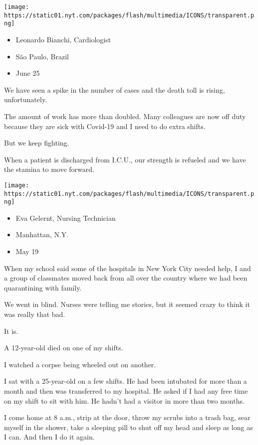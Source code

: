 \texttt{[image: https://static01.nyt.com/packages/flash/multimedia/ICONS/transparent.png]}

\begin{itemize}
\tightlist
\item
  Leonardo Bianchi, Cardiologist
\item
  São Paulo, Brazil
\item
  June 25
\end{itemize}

We have seen a spike in the number of cases and the death toll is
rising, unfortunately.

The amount of work has more than doubled. Many colleagues are now off
duty because they are sick with Covid-19 and I need to do extra shifts.

But we keep fighting.

When a patient is discharged from I.C.U., our strength is refueled and
we have the stamina to move forward.

\texttt{[image: https://static01.nyt.com/packages/flash/multimedia/ICONS/transparent.png]}

\begin{itemize}
\tightlist
\item
  Eva Gelernt, Nursing Technician
\item
  Manhattan, N.Y.
\item
  May 19
\end{itemize}

When my school said some of the hospitals in New York City needed help,
I and a group of classmates moved back from all over the country where
we had been quarantining with family.

We went in blind. Nurses were telling me stories, but it seemed crazy to
think it was really that bad.

It is.

A 12-year-old died on one of my shifts.

I watched a corpse being wheeled out on another.

I sat with a 25-year-old on a few shifts. He had been intubated for more
than a month and then was transferred to my hospital. He asked if I had
any free time on my shift to sit with him. He hadn't had a visitor in
more than two months.

I come home at 8 a.m., strip at the door, throw my scrubs into a trash
bag, sear myself in the shower, take a sleeping pill to shut off my head
and sleep as long as I can. And then I do it again.

